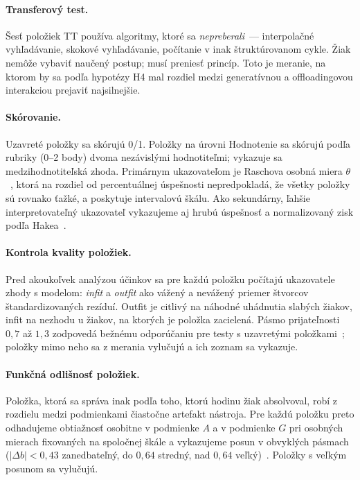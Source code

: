 \paragraph{Transferový test.} Šesť položiek TT používa algoritmy, ktoré sa \emph{nepreberali}~--- interpolačné vyhľadávanie, skokové vyhľadávanie, počítanie v inak štruktúrovanom cykle. Žiak nemôže vybaviť naučený postup; musí preniesť princíp. Toto je meranie, na ktorom by sa podľa hypotézy H4 mal rozdiel medzi generatívnou a offloadingovou interakciou prejaviť najsilnejšie.

\paragraph{Skórovanie.} Uzavreté položky sa skórujú 0/1. Položky na úrovni Hodnotenie sa skórujú podľa rubriky (0--2 body) dvoma nezávislými hodnotiteľmi; vykazuje sa medzihodnotiteľská zhoda. Primárnym ukazovateľom je Raschova osobná miera $\theta$~\cite{boone2016rasch}, ktorá na rozdiel od percentuálnej úspešnosti nepredpokladá, že všetky položky sú rovnako ťažké, a poskytuje intervalovú škálu. Ako sekundárny, ľahšie interpretovateľný ukazovateľ vykazujeme aj hrubú úspešnosť a normalizovaný zisk podľa Hakea~\cite{hake1998interactive}.

\paragraph{Kontrola kvality položiek.} Pred akoukoľvek analýzou účinkov sa pre každú položku počítajú ukazovatele zhody s modelom: \emph{infit} a \emph{outfit} ako vážený a nevážený priemer štvorcov štandardizovaných rezíduí. Outfit je citlivý na náhodné uhádnutia slabých žiakov, infit na nezhodu u žiakov, na ktorých je položka zacielená. Pásmo prijateľnosti $0{,}7$ až $1{,}3$ zodpovedá bežnému odporúčaniu pre testy s uzavretými položkami~\cite{linacre2002fit,wright1979besttest}; položky mimo neho sa z merania vylučujú a ich zoznam sa vykazuje.

\paragraph{Funkčná odlišnosť položiek.} Položka, ktorá sa správa inak podľa toho, ktorú hodinu žiak absolvoval, robí z rozdielu medzi podmienkami čiastočne artefakt nástroja. Pre každú položku preto odhadujeme obtiažnosť osobitne v podmienke $A$ a v podmienke $G$ pri osobných mierach fixovaných na spoločnej škále a vykazujeme posun v obvyklých pásmach ($|{\Delta b}| < 0{,}43$ zanedbateľný, do $0{,}64$ stredný, nad $0{,}64$ veľký)~\cite{zieky2003dif}. Položky s veľkým posunom sa vylučujú.

